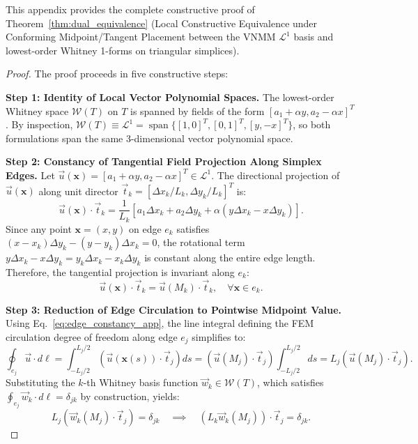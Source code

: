 \documentclass[preprint,12pt]{elsarticle}
\begin{document}
This appendix provides the complete constructive proof of Theorem~\ref{thm:dual_equivalence} (Local Constructive Equivalence under Conforming Midpoint/Tangent Placement between the VNMM $\mathcal{L}^1$ basis and lowest-order Whitney 1-forms on triangular simplices).

\begin{proof}
    The proof proceeds in five constructive steps:

    \textbf{Step 1: Identity of Local Vector Polynomial Spaces.}
    The lowest-order Whitney space $\mathcal{W}(T)$ on $T$ is spanned by fields of the form $[a_1 + \alpha y, a_2 - \alpha x]^T$. By inspection, $\mathcal{W}(T) \equiv \mathcal{L}^1 = \operatorname{span}\{[1,0]^T, [0,1]^T, [y,-x]^T\}$, so both formulations span the same 3-dimensional vector polynomial space.

    \textbf{Step 2: Constancy of Tangential Field Projection Along Simplex Edges.}
    Let $\vec{u}(\mathbf{x}) = [a_1 + \alpha y, a_2 - \alpha x]^T \in \mathcal{L}^1$. The directional projection of $\vec{u}(\mathbf{x})$ along unit director $\vec{t}_k = [\Delta x_k / L_k, \Delta y_k / L_k]^T$ is:
    \begin{equation}
        \vec{u}(\mathbf{x}) \cdot \vec{t}_k = \frac{1}{L_k} \left[ a_1 \Delta x_k + a_2 \Delta y_k + \alpha (y \Delta x_k - x \Delta y_k) \right].
    \end{equation}
    Since any point $\mathbf{x} = (x,y)$ on edge $e_k$ satisfies $(x - x_k)\Delta y_k - (y - y_k)\Delta x_k = 0$, the rotational term $y \Delta x_k - x \Delta y_k = y_k \Delta x_k - x_k \Delta y_k$ is constant along the entire edge length. Therefore, the tangential projection is invariant along $e_k$:
    \begin{equation}
        \vec{u}(\mathbf{x}) \cdot \vec{t}_k = \vec{u}(M_k) \cdot \vec{t}_k, \quad \forall \mathbf{x} \in e_k.
        \label{eq:edge_constancy_app}
    \end{equation}

    \textbf{Step 3: Reduction of Edge Circulation to Pointwise Midpoint Value.}
    Using Eq.~\eqref{eq:edge_constancy_app}, the line integral defining the FEM circulation degree of freedom along edge $e_j$ simplifies to:
    \begin{equation}
        \oint_{e_j} \vec{u} \cdot d\boldsymbol{\ell} = \int_{-L_j/2}^{L_j/2} \left( \vec{u}(\mathbf{x}(s)) \cdot \vec{t}_j \right) ds = \left( \vec{u}(M_j) \cdot \vec{t}_j \right) \int_{-L_j/2}^{L_j/2} ds = L_j \left( \vec{u}(M_j) \cdot \vec{t}_j \right).
    \end{equation}
    Substituting the $k$-th Whitney basis function $\vec{w}_k \in \mathcal{W}(T)$, which satisfies $\oint_{e_j} \vec{w}_k \cdot d\boldsymbol{\ell} = \delta_{jk}$ by construction, yields:
    \begin{equation}
        L_j \left( \vec{w}_k(M_j) \cdot \vec{t}_j \right) = \delta_{jk} \quad \implies \quad \left( L_k \vec{w}_k(M_j) \right) \cdot \vec{t}_j = \delta_{jk}.
        \label{eq:whitney_midpoint_proj_app}
    \end{equation}


\end{proof}
\end{document}
